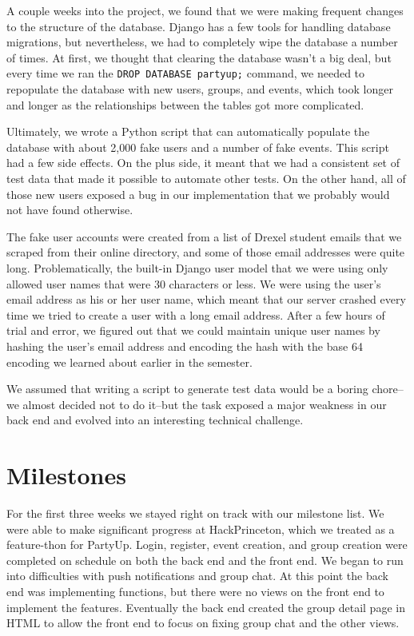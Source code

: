 \documentclass[12pt]{article}
\begin{document}
A couple weeks into the project, we found that we were making frequent changes to the structure of the database.
Django has a few tools for handling database migrations,
but nevertheless, we had to completely wipe the database a number of times.
At first, we thought that clearing the database wasn't a big deal, but
every time we ran the \texttt{DROP DATABASE partyup;} command,
we needed to repopulate the database with new users, groups, and events,
which took longer and longer as the relationships between the tables got more complicated.

Ultimately, we wrote a Python script that can automatically populate the database with
about 2,000 fake users and a number of fake events.
This script had a few side effects.
On the plus side, it meant that we had a consistent set of test data that made it
possible to automate other tests.
On the other hand, all of those new users exposed a bug in our implementation that we 
probably would not have found otherwise.

The fake user accounts were created from a list of Drexel student emails that
we scraped from their online directory,
and some of those email addresses were quite long.
Problematically, the built-in Django user model that we were using only allowed
user names that were 30 characters or less.
We were using the user's email address as his or her user name,
which meant that our server crashed every time we tried to create a user with a long email address.
After a few hours of trial and error, we figured out that we could maintain unique user names
by hashing the user's email address and encoding the hash with the base 64 encoding we learned
about earlier in the semester.

We assumed that writing a script to generate test data would be a boring chore--we almost decided not to do
it--but the task exposed a major weakness in our back end and evolved into an interesting technical challenge.

\section{Milestones}

For the first three weeks we stayed right on track with our milestone list. 
We were able to make significant progress at HackPrinceton, which we treated as a feature-thon for PartyUp. 
Login, register, event creation, and group creation were completed on schedule on both the back end and the front end. 
We began to run into difficulties with push notifications and group chat. 
At this point the back end was implementing functions, but there were no views on the front end to implement the features. 
Eventually the back end created the group detail page in HTML to allow the front end to focus on fixing group chat and the other views. 
\end{document}
